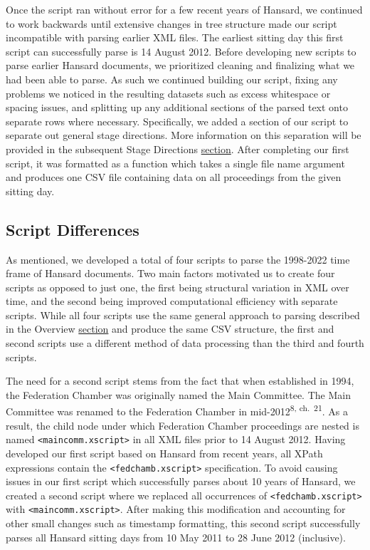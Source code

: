 \documentclass[
  letterpaper,
  DIV=11,
  numbers=noendperiod]{scrartcl}
\begin{document}
Once the script ran without error for a few recent years of Hansard, we
continued to work backwards until extensive changes in tree structure
made our script incompatible with parsing earlier XML files. The
earliest sitting day this first script can successfully parse is 14
August 2012. Before developing new scripts to parse earlier Hansard
documents, we prioritized cleaning and finalizing what we had been able
to parse. As such we continued building our script, fixing any problems
we noticed in the resulting datasets such as excess whitespace or
spacing issues, and splitting up any additional sections of the parsed
text onto separate rows where necessary. Specifically, we added a
section of our script to separate out general stage directions. More
information on this separation will be provided in the subsequent Stage
Directions \protect\hyperlink{sec-stage}{section}. After completing our
first script, it was formatted as a function which takes a single file
name argument and produces one CSV file containing data on all
proceedings from the given sitting day.

\hypertarget{sec-diff}{%
\subsection{Script Differences}\label{sec-diff}}

As mentioned, we developed a total of four scripts to parse the
1998-2022 time frame of Hansard documents. Two main factors motivated us
to create four scripts as opposed to just one, the first being
structural variation in XML over time, and the second being improved
computational efficiency with separate scripts. While all four scripts
use the same general approach to parsing described in the Overview
\protect\hyperlink{sec-overview}{section} and produce the same CSV
structure, the first and second scripts use a different method of data
processing than the third and fourth scripts.

The need for a second script stems from the fact that when established
in 1994, the Federation Chamber was originally named the Main Committee.
The Main Committee was renamed to the Federation Chamber in
mid-2012\textsuperscript{8, ch.~21}. As a result, the child node under
which Federation Chamber proceedings are nested is named
\texttt{\textless{}maincomm.xscript\textgreater{}} in all XML files
prior to 14 August 2012. Having developed our first script based on
Hansard from recent years, all XPath expressions contain the
\texttt{\textless{}fedchamb.xscript\textgreater{}} specification. To
avoid causing issues in our first script which successfully parses about
10 years of Hansard, we created a second script where we replaced all
occurrences of \texttt{\textless{}fedchamb.xscript\textgreater{}} with
\texttt{\textless{}maincomm.xscript\textgreater{}}. After making this
modification and accounting for other small changes such as timestamp
formatting, this second script successfully parses all Hansard sitting
days from 10 May 2011 to 28 June 2012 (inclusive).
\end{document}
